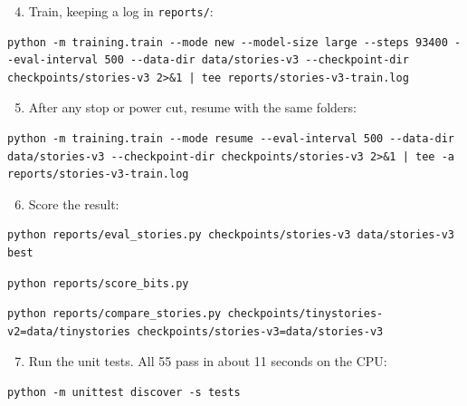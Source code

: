 \documentclass[11pt,a4paper]{article}
\newcommand{\code}[1]{\texttt{#1}}
\begin{document}
\begin{enumerate}
\setcounter{enumi}{3}
\item Train, keeping a log in \code{reports/\allowbreak{}}:
\end{enumerate}

\begin{lstlisting}
python -m training.train --mode new --model-size large --steps 93400 --eval-interval 500 --data-dir data/stories-v3 --checkpoint-dir checkpoints/stories-v3 2>&1 | tee reports/stories-v3-train.log
\end{lstlisting}

\begin{enumerate}
\setcounter{enumi}{4}
\item After any stop or power cut, resume with the same folders:
\end{enumerate}

\begin{lstlisting}
python -m training.train --mode resume --eval-interval 500 --data-dir data/stories-v3 --checkpoint-dir checkpoints/stories-v3 2>&1 | tee -a reports/stories-v3-train.log
\end{lstlisting}

\begin{enumerate}
\setcounter{enumi}{5}
\item Score the result:
\end{enumerate}

\begin{lstlisting}
python reports/eval_stories.py checkpoints/stories-v3 data/stories-v3 best
\end{lstlisting}

\begin{lstlisting}
python reports/score_bits.py
\end{lstlisting}

\begin{lstlisting}
python reports/compare_stories.py checkpoints/tinystories-v2=data/tinystories checkpoints/stories-v3=data/stories-v3
\end{lstlisting}

\begin{enumerate}
\setcounter{enumi}{6}
\item Run the unit tests. All 55 pass in about 11 seconds on the CPU:
\end{enumerate}

\begin{lstlisting}
python -m unittest discover -s tests
\end{lstlisting}
\end{document}
